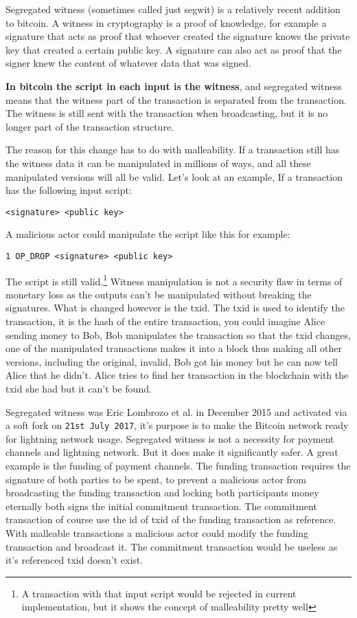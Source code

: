 \label{segwit}
Segregated witness (sometimes called just segwit) is a relatively recent addition to bitcoin. A witness in cryptography is a proof of knowledge, for example a signature that acts as proof that whoever created the signature knows the private key that created a certain public key. A signature can also act as proof that the signer knew the content of whatever data that was signed.\cite{antonopoulos_2017}\cite{ecc_def}

\textbf{In bitcoin the script in each input is the witness}, and segregated witness means that the witness part of the transaction is separated from the transaction. The witness is still sent with the transaction when broadcasting, but it is no longer part of the transaction structure.\cite{antonopoulos_2017}\cite{segwitbip}

The reason for this change has to do with malleability. If a transaction still has the witness data it can be manipulated in millions of ways, and all these manipulated versions will all be valid. Let's look at an example, If a transaction has the following input script:

\texttt{<signature> <public key>}

A malicious actor could manipulate the script like this for example:

\texttt{1 OP\_DROP <signature> <public key>}

The script is still valid.\footnote{A transaction with that input script would be rejected in current implementation, but it shows the concept of malleability pretty well} Witness manipulation is not a security flaw in terms of monetary loss as the outputs can't be manipulated without breaking the signatures. What is changed however is the txid. The txid is used to identify the transaction, it is the hash of the entire transaction, you could imagine Alice sending money to Bob, Bob manipulates the transaction so that the txid changes, one of the manipulated transactions makes it into a block thus making all other versions, including the original, invalid, Bob got his money but he can now tell Alice that he didn't. Alice tries to find her transaction in the blockchain with the txid she had but it can't be found.

Segregated witness was Eric Lombrozo et al. in December 2015 and activated via a soft fork on \texttt{21st July 2017}\cite{antonopoulos_2017}\cite{segwitbip}, it's purpose is to make the Bitcoin network ready for lightning network usage.\cite{segwitbip} Segregated witness is not a necessity for payment channels and lightning network. But it does make it significantly safer.\cite{segwitbip} A great example is the funding of payment channels. The funding transaction requires the signature of both parties to be spent, to prevent a malicious actor from broadcasting the funding transaction and locking both participants money eternally both signs the initial commitment transaction. The commitment transaction of course use the id of txid of the funding transaction as reference. With malleable transactions a malicious actor could modify the funding transaction and broadcast it. The commitment transaction would be useless as it's referenced txid doesn't exist.

